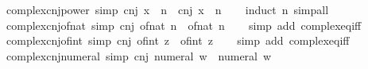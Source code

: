\begin{isabellebody}
\endisatagproof
{\isafoldproof}%
%
\isadelimproof
\isanewline
%
\endisadelimproof
\isanewline
{}\isamarkupfalse%
\ complex{\isacharunderscore}{\kern0pt}cnj{\isacharunderscore}{\kern0pt}power\ {\isacharbrackleft}{\kern0pt}simp{\isacharbrackright}{\kern0pt}{\isacharcolon}{\kern0pt}\ {\isachardoublequoteopen}cnj\ {\isacharparenleft}{\kern0pt}x\ {\isacharcircum}{\kern0pt}\ n{\isacharparenright}{\kern0pt}\ {\isacharequal}{\kern0pt}\ cnj\ x\ {\isacharcircum}{\kern0pt}\ n{\isachardoublequoteclose}\isanewline
%
\isadelimproof
\ \ %
\endisadelimproof
%
\isatagproof
{}\isamarkupfalse%
\ {\isacharparenleft}{\kern0pt}induct\ n{\isacharparenright}{\kern0pt}\ simp{\isacharunderscore}{\kern0pt}all%
\endisatagproof
{\isafoldproof}%
%
\isadelimproof
\isanewline
%
\endisadelimproof
\isanewline
{}\isamarkupfalse%
\ complex{\isacharunderscore}{\kern0pt}cnj{\isacharunderscore}{\kern0pt}of{\isacharunderscore}{\kern0pt}nat\ {\isacharbrackleft}{\kern0pt}simp{\isacharbrackright}{\kern0pt}{\isacharcolon}{\kern0pt}\ {\isachardoublequoteopen}cnj\ {\isacharparenleft}{\kern0pt}of{\isacharunderscore}{\kern0pt}nat\ n{\isacharparenright}{\kern0pt}\ {\isacharequal}{\kern0pt}\ of{\isacharunderscore}{\kern0pt}nat\ n{\isachardoublequoteclose}\isanewline
%
\isadelimproof
\ \ %
\endisadelimproof
%
\isatagproof
{}\isamarkupfalse%
\ {\isacharparenleft}{\kern0pt}simp\ add{\isacharcolon}{\kern0pt}\ complex{\isacharunderscore}{\kern0pt}eq{\isacharunderscore}{\kern0pt}iff{\isacharparenright}{\kern0pt}%
\endisatagproof
{\isafoldproof}%
%
\isadelimproof
\isanewline
%
\endisadelimproof
\isanewline
{}\isamarkupfalse%
\ complex{\isacharunderscore}{\kern0pt}cnj{\isacharunderscore}{\kern0pt}of{\isacharunderscore}{\kern0pt}int\ {\isacharbrackleft}{\kern0pt}simp{\isacharbrackright}{\kern0pt}{\isacharcolon}{\kern0pt}\ {\isachardoublequoteopen}cnj\ {\isacharparenleft}{\kern0pt}of{\isacharunderscore}{\kern0pt}int\ z{\isacharparenright}{\kern0pt}\ {\isacharequal}{\kern0pt}\ of{\isacharunderscore}{\kern0pt}int\ z{\isachardoublequoteclose}\isanewline
%
\isadelimproof
\ \ %
\endisadelimproof
%
\isatagproof
{}\isamarkupfalse%
\ {\isacharparenleft}{\kern0pt}simp\ add{\isacharcolon}{\kern0pt}\ complex{\isacharunderscore}{\kern0pt}eq{\isacharunderscore}{\kern0pt}iff{\isacharparenright}{\kern0pt}%
\endisatagproof
{\isafoldproof}%
%
\isadelimproof
\isanewline
%
\endisadelimproof
\isanewline
{}\isamarkupfalse%
\ complex{\isacharunderscore}{\kern0pt}cnj{\isacharunderscore}{\kern0pt}numeral\ {\isacharbrackleft}{\kern0pt}simp{\isacharbrackright}{\kern0pt}{\isacharcolon}{\kern0pt}\ {\isachardoublequoteopen}cnj\ {\isacharparenleft}{\kern0pt}numeral\ w{\isacharparenright}{\kern0pt}\ {\isacharequal}{\kern0pt}\ numeral\ w{\isachardoublequoteclose}\isanewline

\end{isabellebody}
